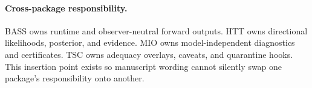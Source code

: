 \paragraph{Cross-package responsibility.}
BASS owns runtime and observer-neutral forward outputs. HTT owns
directional likelihoods, posterior, and evidence. MIO owns
model-independent diagnostics and certificates. TSC owns adequacy overlays,
caveats, and quarantine hooks. This insertion point exists so manuscript
wording cannot silently swap one package's responsibility onto another.
